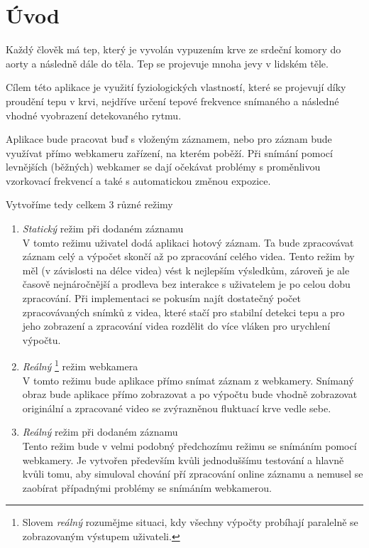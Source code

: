 \documentclass[
  digital, %
  table,   %
%
  lof,     %
  lot,     %
]{fithesis3}
\begin{document}
\chapter{Úvod}
Každý člověk má tep, který je vyvolán vypuzením krve ze srdeční komory do aorty a následně dále do těla. Tep se projevuje mnoha jevy v lidském těle.

Cílem této aplikace je využití fyziologických vlastností, které se projevují díky proudění tepu v krvi, nejdříve určení tepové frekvence snímaného a následné vhodné vyobrazení detekovaného rytmu.

Aplikace bude pracovat buď s vloženým záznamem, nebo pro záznam bude využívat přímo webkameru zařízení, na kterém poběží. Při snímání pomocí levnějších (běžných) webkamer se dají očekávat problémy s proměnlivou vzorkovací frekvencí a také s automatickou změnou expozice.

Vytvoříme tedy celkem 3 různé režimy
\begin{enumerate}
	\item \emph{Statický} režim při dodaném záznamu \\
    V tomto režimu uživatel dodá aplikaci hotový záznam. Ta bude zpracovávat záznam celý a výpočet skončí až po zpracování celého videa. Tento režim by měl (v závislosti na délce videa) vést k nejlepším výsledkům, zároveň je ale časově nejnáročnější a prodleva bez interakce s uživatelem je po celou dobu zpracování. Při implementaci se pokusím najít dostatečný počet zpracovávaných snímků z videa, které stačí pro stabilní detekci tepu a pro jeho zobrazení a zpracování videa rozdělit do více vláken pro urychlení výpočtu.
    \item \emph{Reálný} \footnote{Slovem \emph{reálný} rozumějme situaci, kdy všechny výpočty probíhají paralelně se zobrazovaným výstupem uživateli. } režim webkamera \\
    V tomto režimu bude aplikace přímo snímat záznam z webkamery. Snímaný obraz bude aplikace přímo zobrazovat a po výpočtu bude vhodně zobrazovat originální a zpracované video se zvýrazněnou fluktuací krve vedle sebe.
	\item \emph{Reálný} režim při dodaném záznamu \\
    Tento režim bude v velmi podobný předchozímu režimu se snímáním pomocí webkamery. Je vytvořen především kvůli jednoduššímu testování a hlavně kvůli tomu, aby simuloval chování pří zpracování online záznamu a nemusel se zaobírat případnými problémy se snímáním webkamerou.
\end{enumerate}
\end{document}
